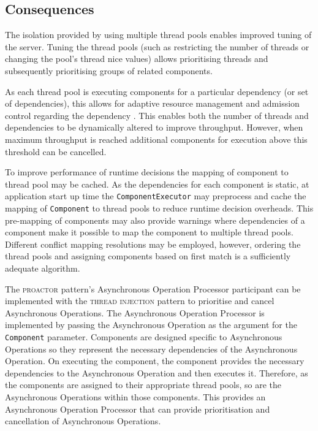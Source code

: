 \documentclass[prodmode]{style/acmlarge}
\begin{document}
\subsection{Consequences}

The isolation provided by using multiple thread pools enables improved tuning of
the server.  Tuning the thread pools (such as restricting the number of threads
or changing the pool's thread nice values) allows prioritising threads and
subsequently prioritising groups of related components.

As each thread pool is executing components for a particular dependency (or set
of dependencies), this allows for adaptive resource management and admission
control regarding the dependency \cite{seda}.  This enables both the number of
threads and dependencies to be dynamically altered to improve throughput.
However, when maximum throughput is reached additional components for execution
above this threshold can be cancelled.

To improve performance of runtime decisions the mapping of component to thread
pool may be cached.  As the dependencies for each component is static, at
application start up time the \texttt{ComponentExecutor} may preprocess and
cache the mapping of \texttt{Component} to thread pools to reduce runtime
decision overheads.  This pre-mapping of components may also provide warnings
where dependencies of a component make it possible to map the component to
multiple thread pools.  Different conflict mapping resolutions may be employed,
however, ordering the thread pools and assigning components based on first match
is a sufficiently adequate algorithm.

The \textsc{proactor} pattern's Asynchronous Operation Processor participant can
be implemented with the \textsc{thread injection} pattern to prioritise and cancel
Asynchronous Operations.  The Asynchronous Operation Processor is implemented by
passing the Asynchronous Operation as the argument for the \texttt{Component}
parameter.  Components are designed specific to Asynchronous Operations so they
represent the necessary dependencies of the Asynchronous Operation.  On
executing the component, the component provides the necessary dependencies to
the Asynchronous Operation and then executes it.  Therefore, as the components
are assigned to their appropriate thread pools, so are the Asynchronous
Operations within those components.  This provides an Asynchronous Operation
Processor that can provide prioritisation and cancellation of Asynchronous
Operations.
\end{document}
